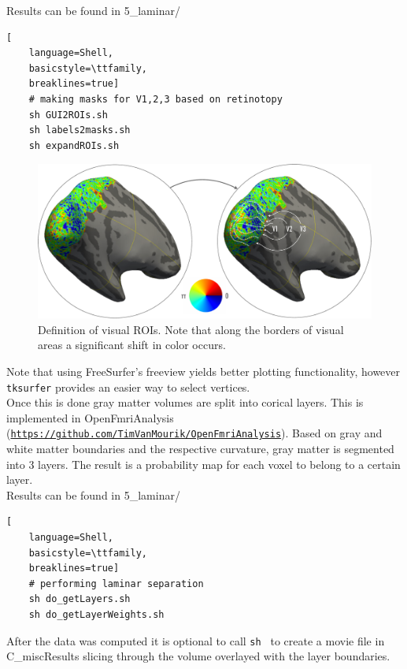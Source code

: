 \documentclass[12pt,a4paper]{scrartcl}
\begin{document}
\noindent Results can be found in 5\_laminar/\\
\begin{lstlisting}[
    language=Shell,
    basicstyle=\ttfamily,
    breaklines=true]
    # making masks for V1,2,3 based on retinotopy
    sh GUI2ROIs.sh
    sh labels2masks.sh
    sh expandROIs.sh
\end{lstlisting}
\begin{figure}
\begin{center}
\includegraphics[width=1\textwidth]{ROIselpRF}
\caption[Example for visual ROI definition]{Definition of visual ROIs. Note that along the borders of visual areas a significant shift in color occurs.}
\label{fig:ROIpRF}
\end{center}
\end{figure}
Note that using FreeSurfer's freeview yields better plotting functionality, however \texttt{tksurfer} provides an easier way to select vertices.\\
Once this is done gray matter volumes are split into corical layers. This is implemented in OpenFmriAnalysis (\href{https://github.com/TimVanMourik/OpenFmriAnalysis}{\nolinkurl{https://github.com/TimVanMourik/OpenFmriAnalysis}}). Based on gray and white matter boundaries and the respective curvature, gray matter is segmented into 3 layers. The result is a probability map for each voxel to belong to a certain layer.\\

\noindent Results can be found in 5\_laminar/\\
\begin{lstlisting}[
    language=Shell,
    basicstyle=\ttfamily,
    breaklines=true]
    # performing laminar separation
    sh do_getLayers.sh
    sh do_getLayerWeights.sh
\end{lstlisting}

After the data was computed it is optional to call \texttt{sh } to create a movie file in C\_miscResults slicing through the volume overlayed with the layer boundaries.
\FloatBarrier
\end{document}
